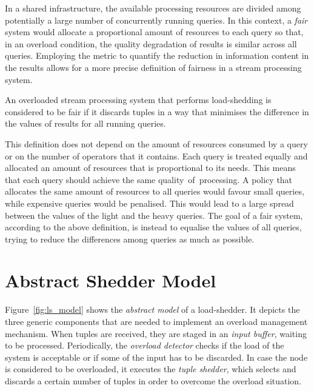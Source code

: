 In a shared infrastructure, the available processing resources are divided among potentially a large
number of concurrently running queries. In this context, a \emph{fair} system would allocate a proportional amount
of resources to each query so that, in an overload condition, the quality degradation of results is
similar across all queries. Employing the \sic metric to quantify the reduction in information content
in the results allows for a more precise definition of fairness in a stream processing system.
\begin{definition}{
An overloaded stream processing system that performs load-shedding is considered to be fair if it
discards tuples in a way that minimises the difference in the \sic values of results for all running
queries.
}
\end{definition}	
This definition does not depend on the amount of resources consumed by a query or on
the number of operators that it contains. Each query is treated equally and allocated an amount of
resources that is proportional to its needs. This means that each query should achieve the same
\mbox{quality of processing}. A policy that allocates the same amount of resources to all queries
would favour small queries, while expensive queries would be penalised. This would lead to a large spread
between the \sic values of the light and the heavy queries. The goal of a fair system, according to
the above definition, is instead to equalise the \sic values of all queries, trying to reduce the differences
among queries as much as possible.

   
\section{Abstract Shedder Model}
\label{sec:abs-shedder}

Figure~\ref{fig:ls_model} shows the \emph{abstract model} of a load-shedder. It depicts the three generic
components that are needed to implement an overload management mechanism. When tuples are
received, they are staged in an \emph{input buffer}, waiting to be processed. Periodically, the \emph{overload detector}
checks if the load of the system is acceptable or if some of the input has to be discarded. In case the
node is considered to be overloaded, it executes the \emph{tuple shedder}, which selects and discards a
certain number of tuples in order to overcome the overload situation.
 
